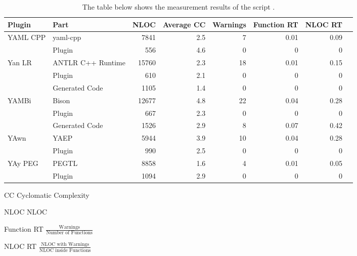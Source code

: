 \begin{table}[H]
  \begin{adjustbox}{max width=\textwidth}
  \begin{threeparttable}
  \caption{The table below shows the measurement results of the script \FileCheckComplexity{}.}
  \label{table:cyclomatic_complexity}
  \centering
  \begin{tabular}{llrrrrrr}
\toprule
     Plugin &                    Part &  NLOC & Average CC & Warnings & Function RT & NLOC RT\\
\midrule
   YAML CPP &                yaml-cpp &  7841 &        2.5 &        7 &        0.01 &    0.09\\
            &                  Plugin &   556 &        4.6 &        0 &           0 &       0\\
\midrule
     Yan LR & \gls{ANTLR} C++ Runtime & 15760 &        2.3 &       18 &        0.01 &    0.15\\
            &                  Plugin &   610 &        2.1 &        0 &           0 &       0\\
            &          Generated Code &  1105 &        1.4 &        0 &           0 &       0\\
\midrule
      YAMBi &                   Bison & 12677 &        4.8 &       22 &        0.04 &    0.28\\
            &                  Plugin &   667 &        2.3 &        0 &           0 &       0\\
            &          Generated Code &  1526 &        2.9 &        8 &        0.07 &    0.42\\
\midrule
       YAwn &                    YAEP &  5944 &        3.9 &       10 &        0.04 &    0.28\\
            &                  Plugin &   990 &        2.5 &        0 &           0 &       0\\
\midrule
    YAy PEG &                   PEGTL &  8858 &        1.6 &        4 &        0.01 &    0.05\\
            &                  Plugin &  1094 &        2.9 &        0 &           0 &       0\\
\bottomrule
  \end{tabular}

  \vspace{0.2cm}
  \begin{tablenotes}
    \item[CC] Cyclomatic Complexity\\
    \item[NLOC] \glsdesc{NLOC}\\
    \item[Function RT] $\frac{\text{Warnings}}{\text{Number of Functions}}$\\
    \item[NLOC RT] $\frac{\text{NLOC with Warnings}}{\text{NLOC inside Functions}}$\\
  \end{tablenotes}

  \end{threeparttable}
  \end{adjustbox}
\end{table}


